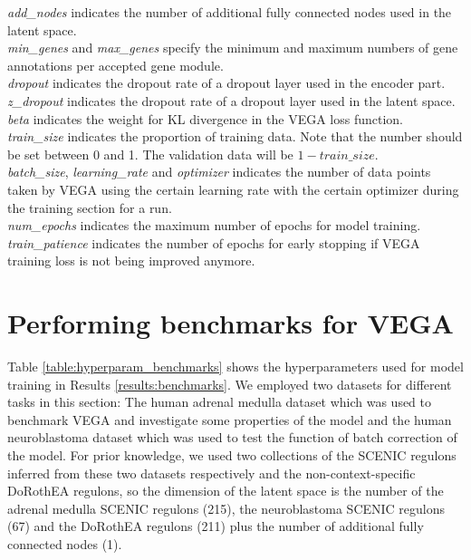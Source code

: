 \noindent\textit{add\_nodes} indicates the number of additional fully connected nodes used in the latent space.\\
\textit{min\_genes} and \textit{max\_genes} specify the minimum and maximum numbers of gene annotations per accepted gene module.\\
\textit{dropout} indicates the dropout rate of a dropout layer used in the encoder part.\\
\textit{z\_dropout} indicates the dropout rate of a dropout layer used in the latent space.\\
\textit{beta} indicates the weight for KL divergence in the VEGA loss function.\\
\textit{train\_size} indicates the proportion of training data. Note that the number should be set between 0 and 1. The validation data will be $1-train\_size$.\\
\textit{batch\_size}, \textit{learning\_rate} and \textit{optimizer} indicates the number of data points taken by VEGA using the certain learning rate with the certain optimizer during the training section for a run.\\
\textit{num\_epochs} indicates the maximum number of epochs for model training.\\
\textit{train\_patience} indicates the number of epochs for early stopping if VEGA training loss is not being improved anymore.

\section*{Performing benchmarks for VEGA}
Table \ref{table:hyperparam_benchmarks} shows the hyperparameters used for model training in Results \ref{results:benchmarks}. We employed two datasets for different tasks in this section: The human adrenal medulla dataset\cite{Jansky2021} which was used to benchmark VEGA and investigate some properties of the model and the human neuroblastoma dataset\cite{Jansky2021} which was used to test the function of batch correction of the model. For prior knowledge, we used two collections of the SCENIC\cite{Aibar2017} regulons inferred from these two datasets respectively and the non-context-specific DoRothEA\cite{Garcia-Alonso2019} regulons, so the dimension of the latent space is the number of the adrenal medulla SCENIC regulons (215), the neuroblastoma SCENIC regulons (67) and the DoRothEA regulons (211) plus the number of additional fully connected nodes (1).

